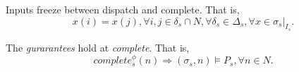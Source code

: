 Inputs freeze between dispatch and complete. That is,
\begin{equation} 
\label{eqn:inputfreeze}
x(i) = x(j), \forall i,j\in \delta_s \cap N, \forall \delta_s \in \Delta_s, \forall x \in \sigma_s|_{I_s}.
\end{equation}

The \emph{gurarantees} hold at \emph{complete}. That is,
\begin{equation} 
\label{eqn:guarantee}
complete_s^\phi(n) \Rightarrow (\sigma_s, n) \models P_s, \forall n\in N.
\end{equation}
